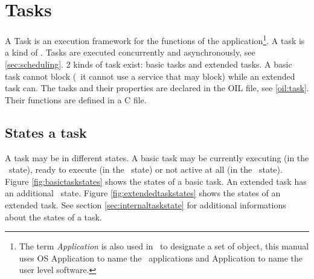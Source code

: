 
\chapter{Tasks}

A Task is an execution framework for the functions of the application\footnote{The term {\em Application} is also used in \autosar\ to designate a set of object, this manual uses OS Application to name the \autosar\ applications and Application to name the user level software.}. A task is a kind of \process. Tasks are executed concurrently and asynchronously, see \ref{sec:scheduling}. 2 kinds of task exist: basic tasks and extended tasks. A basic task cannot block (\ie\ it cannot use a service that may block) while an extended task can.
The tasks and their properties are declared in the OIL file, see \ref{oil:task}. Their functions are defined in a C file.

\section{States a task}
\label{sec:taskstate}

A task may be in different states. A basic task may be currently executing (in the \RUNNING\ state), ready to execute (in the \READY\ state) or not active at all (in the \SUSPENDED\ state). Figure \ref{fig:basictaskstates} shows the states of a basic task. An extended task has an additional \WAITING\ state.  Figure \ref{fig:extendedtaskstates} shows the states of an extended task. See section \ref{sec:internaltaskstate} for additional informations about the states of a task.

